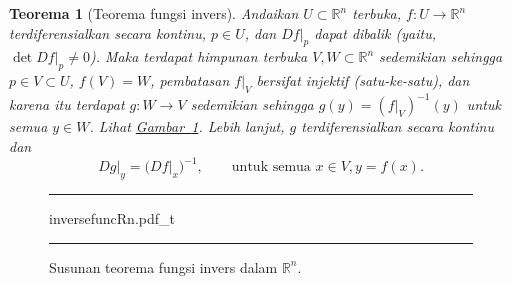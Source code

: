\documentclass[12pt,openany]{book}
\newcommand{\R}{{\mathbb{R}}}
\theoremstyle{plain}
\newtheorem{thm}{Teorema}[section]
\theoremstyle{remark}
\theoremstyle{definition}
\newenvironment{myfig}{%
\begin{figure}[h!t]
\noindent\rule{\textwidth}{0.5pt}\vspace{12pt}\par\centering}%
{\par\noindent\rule{\textwidth}{0.5pt}
\end{figure}}
\theoremstyle{exercise}
\theoremstyle{example}
\newcommand{\figureref}[1]{\hyperref[#1]{Gambar~\ref*{#1}}}
\begin{document}
\begin{thm}[Teorema fungsi invers]
\label{thm:inverse}
Andaikan $U \subset \R^n$ terbuka,
$f \colon U \to \R^n$ terdiferensialkan secara kontinu, $p \in U$, dan $Df|_p$ dapat dibalik
(yaitu, $\det Df|_p \neq 0$).
Maka terdapat himpunan terbuka $V, W \subset \R^n$ sedemikian sehingga
$p \in V \subset U$, $f(V) = W$, pembatasan $f|_V$ bersifat injektif (satu-ke-satu),
dan karena itu terdapat $g \colon W \to V$ sedemikian sehingga
$g(y) = (f|_V)^{-1}(y)$ untuk semua $y \in W$.
Lihat \figureref{fig:inversefuncRn}.
Lebih lanjut, $g$ terdiferensialkan secara kontinu
dan
\begin{equation*}
Dg|_y = {\bigl(Df|_x\bigr)}^{-1}, \qquad \text{untuk semua } x \in V, y = f(x).
\end{equation*}
\end{thm}

\begin{myfig}
{inversefuncRn.pdf_t}
\caption{Susunan teorema fungsi invers dalam $\R^n$.\label{fig:inversefuncRn}}
\end{myfig}
\end{document}
